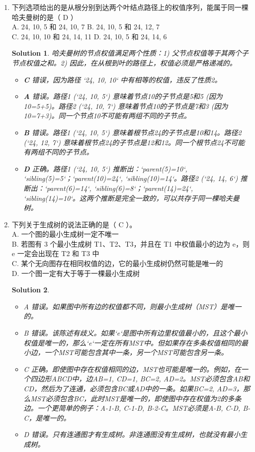 \documentclass[UTF8]{report}
\newtheorem{solution}{Solution}
\theoremstyle{MyLineTheoremStyle} %
\theoremstyle{MyBlockTheoremStyle} %
\theoremstyle{MySubsubsectionStyle} %
\begin{document}
\begin{enumerate}
    \item 下列选项给出的是从根分别到达两个叶结点路径上的权值序列，能属于同一棵哈夫曼树的是（ D ）\\
    A. 24, 10, 5 和 24, 10, 7 \quad B. 24, 10, 5 和 24, 12, 7 \\
    C. 24, 10, 10 和 24, 14, 11 \quad D. 24, 10, 5 和 24, 14, 6
    \begin{solution}
        哈夫曼树的节点权值满足两个性质：1) 父节点权值等于其两个子节点权值之和。2) 因此，在从根到叶的路径上，权值必须是严格递减的。
        \begin{itemize}
            \item \textbf{C} 错误，因为路径 `24, 10, 10` 中有相等的权值，违反了性质2。
            \item \textbf{A} 错误。路径1 (`24, 10, 5`) 意味着节点10的子节点是5和5 (因为10=5+5)。路径2 (`24, 10, 7`) 意味着节点10的子节点是7和3 (因为10=7+3)。同一个节点10不可能有两组不同的子节点。
            \item \textbf{B} 错误。路径1 (`24, 10, 5`) 意味着根节点24的子节点是10和14。路径2 (`24, 12, 7`) 意味着根节点24的子节点是12和12。同一个根节点24不可能有两组不同的子节点。
            \item \textbf{D} 正确。路径1 (`24, 10, 5`) 推断出：`parent(5)=10`, `sibling(5)=5`；`parent(10)=24`, `sibling(10)=14`。路径2 (`24, 14, 6`) 推断出：`parent(6)=14`, `sibling(6)=8`；`parent(14)=24`, `sibling(14)=10`。这两个推断是完全一致的，可以共存于同一棵哈夫曼树。
        \end{itemize}
    \end{solution}
    \item 下列关于生成树的说法正确的是（ C ）。\\
    A. 一个图的最小生成树一定不唯一 \\
    B. 若图有 3 个最小生成树 T1、T2、T3，并且在 T1 中权值最小的边为 e，则 e 一定会出现在 T2 和 T3 中 \\
    C. 某个无向图存在相同权值的边，它的最小生成树仍然可能是唯一的 \\
    D. 一个图一定有大于等于一棵最小生成树
    \begin{solution}
        \begin{itemize}
            \item A 错误。如果图中所有边的权值都不同，则最小生成树（MST）是唯一的。
            \item B 错误。该陈述有歧义。如果`e`是图中所有边里权值最小的，且这个最小权值是唯一的，那么`e`一定在所有MST中。但如果存在多条权值相同的最小边，一个MST可能包含其中一条，另一个MST可能包含另一条。
            \item C 正确。即使图中存在权值相同的边，MST也可能是唯一的。例如，在一个四边形ABCD中，边AB=1, CD=1, BC=2, AD=2。MST必须包含AB和CD，然后为了连通，必须包含BC或AD中的一条。如果BC=2, AD=3，那么MST必须包含BC，此时MST是唯一的，即使图中存在权值为2的多条边。一个更简单的例子：A-1-B, C-1-D, B-2-C。MST必须是{A-B, C-D, B-C}，是唯一的。
            \item D 错误。只有连通图才有生成树。非连通图没有生成树，也就没有最小生成树。
        \end{itemize}
    \end{solution}


\end{enumerate}
\end{document}
